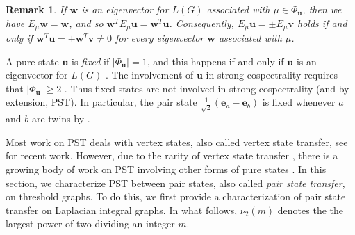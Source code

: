 \documentclass[preprint]{elsarticle}
\newcommand{\supp}{{\Phi}}
\newtheorem{remark}[theorem]{Remark}
\begin{document}
\begin{remark}
\label{remSC}
If $\mathbf{w}$ is an eigenvector for $L(G)$ associated with $\mu\in\supp_{\mathbf{u}}$, then we have $E_\mu\mathbf{w}=\mathbf{w}$, and so $\mathbf{w}^TE_\mu\mathbf{u}=\mathbf{w}^T\mathbf{u}$. Consequently, $E_\mu\mathbf{u}=\pm E_\mu\mathbf{v}$ holds if and only if $\mathbf{w}^T\mathbf{u}=\pm \mathbf{w}^T\mathbf{v}\neq 0$ for every eigenvector $\mathbf{w}$ associated with $\mu$.
\end{remark}

A pure state $\mathbf{u}$ is \textit{fixed} if $|\supp_{\mathbf{u}}|=1$, and this happens if and only if $\mathbf{u}$ is an eigenvector for $L(G)$ \cite[Proposition 2.3]{godsil2025perfect}. The involvement of $\mathbf{u}$ in strong cospectrality requires that $|\supp_{\mathbf{u}}|\geq 2$ \cite[Section 4]{godsil2025perfect}. Thus fixed states are not involved in strong cospectrality (and by extension, PST). In particular, the pair state $\frac{1}{\sqrt{2}}(\mathbf{e}_a-\mathbf{e}_b)$ is fixed whenever $a$ and $b$ are twins by \cite[Lemma 2.9]{Monterde2022}. 

Most work on PST deals with vertex states, also called vertex state transfer, see \cite{kirkland2026quantum,MONTERDE2025} for recent work. 
However, due to the rarity of vertex state transfer \cite{godsil2012state}, there is a growing body of work on PST involving other forms of pure states \cite{chen2020pair,godsil2025quantum,kim2024generalization}. In this section, we characterize PST between pair states, also called \textit{pair state transfer}, on threshold graphs. To do this, we first provide a characterization of pair state transfer on Laplacian integral graphs. In what follows, $\nu_2(m)$ denotes the the largest power of two dividing an integer $m$.
\end{document}
